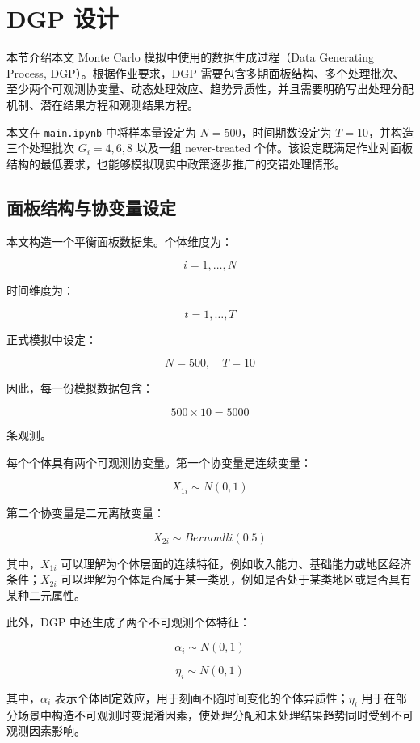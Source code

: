 \documentclass[
  fontset=windows]{ctexart}
\begin{document}
\section{DGP 设计}\label{dgp-ux8bbeux8ba1}

本节介绍本文 Monte Carlo 模拟中使用的数据生成过程（Data Generating
Process, DGP）。根据作业要求，DGP
需要包含多期面板结构、多个处理批次、至少两个可观测协变量、动态处理效应、趋势异质性，并且需要明确写出处理分配机制、潜在结果方程和观测结果方程。

本文在 \texttt{main.ipynb} 中将样本量设定为 \(N=500\)，时间期数设定为
\(T=10\)，并构造三个处理批次 \(G_i=4,6,8\) 以及一组 never-treated
个体。该设定既满足作业对面板结构的最低要求，也能够模拟现实中政策逐步推广的交错处理情形。

\subsection{面板结构与协变量设定}\label{ux9762ux677fux7ed3ux6784ux4e0eux534fux53d8ux91cfux8bbeux5b9a}

本文构造一个平衡面板数据集。个体维度为：

\[
i=1,\ldots,N
\]

时间维度为：

\[
t=1,\ldots,T
\]

正式模拟中设定：

\[
N=500,\quad T=10
\]

因此，每一份模拟数据包含：

\[
500\times 10=5000
\]

条观测。

每个个体具有两个可观测协变量。第一个协变量是连续变量：

\[
X_{1i}\sim N(0,1)
\]

第二个协变量是二元离散变量：

\[
X_{2i}\sim Bernoulli(0.5)
\]

其中，\(X_{1i}\)
可以理解为个体层面的连续特征，例如收入能力、基础能力或地区经济条件；\(X_{2i}\)
可以理解为个体是否属于某一类别，例如是否处于某类地区或是否具有某种二元属性。

此外，DGP 中还生成了两个不可观测个体特征：

\[
\alpha_i\sim N(0,1)
\]

\[
\eta_i\sim N(0,1)
\]

其中，\(\alpha_i\)
表示个体固定效应，用于刻画不随时间变化的个体异质性；\(\eta_i\)
用于在部分场景中构造不可观测时变混淆因素，使处理分配和未处理结果趋势同时受到不可观测因素影响。
\end{document}
